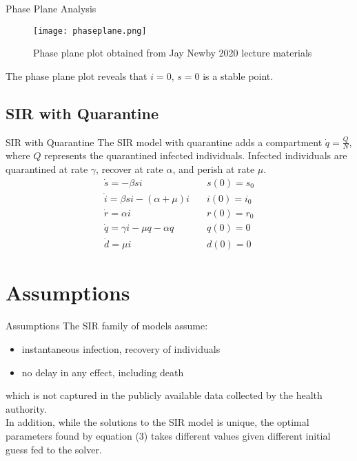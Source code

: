 \documentclass{beamer}
\begin{document}
\begin{frame}{Phase Plane Analysis}
\begin{figure}
  \texttt{[image: phaseplane.png]}
  \caption{Phase plane plot obtained from Jay Newby 2020 lecture materials}
  \label{fig:phaseplan}
\end{figure}
\vspace{-6mm}
The phase plane plot reveals that $i = 0$, $s = 0$ is a stable point. 
\end{frame}


\subsection{SIR with Quarantine}
\begin{frame}{SIR with Quarantine}
The SIR model with quarantine adds a compartment $\dot{q} = \frac{Q}{N}$, where $Q$ represents the quarantined infected individuals. Infected individuals are quarantined at rate $\gamma$, recover at rate $\alpha$, and perish at rate $\mu$.   
\begin{equation}
       \begin{array}{ll}
      \dot{s} = - \beta s i  & \quad s(0) = s_0 \\
       \dot{i} = \beta s i - (\alpha + \mu)i & \quad i(0) = i_0 \\
       \dot{r} = \alpha i  & \quad r(0) = r_0 \\ 
       \dot{q} = \gamma i - \mu q - \alpha q & \quad q(0) = 0 \\
       \dot{d} = \mu i & \quad d(0) = 0 
        \end{array}
\end{equation}
\end{frame}


\section{Assumptions}
\begin{frame}{Assumptions}
The SIR family of models assume:
\begin{itemize}
	\item instantaneous infection, recovery of individuals
	\item no delay in any effect, including death
\end{itemize}
which is not captured in the publicly available data collected by the health authority. \\

\bigskip 
In addition, while the solutions to the SIR model is unique, the optimal parameters found by equation (3) takes different values given different initial guess fed to the solver. 

\end{frame}
\end{document}
